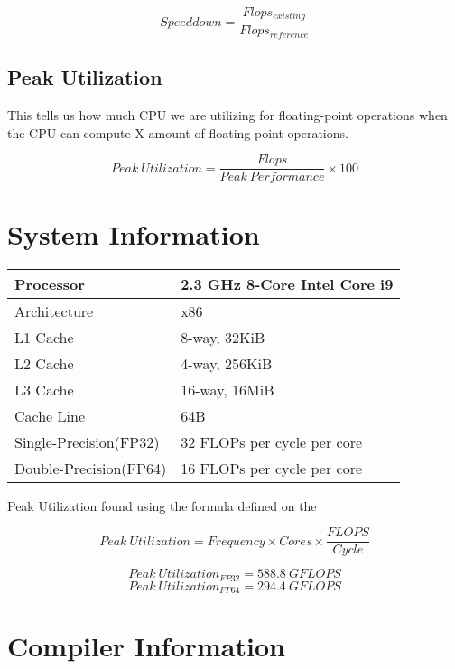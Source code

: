 \begin{equation}
    Speeddown = \frac{Flops_{existing}}{Flops_{reference}}
    \label{equ:speeddown}
\end{equation}

\subsection{Peak Utilization}

This tells us how much CPU we are utilizing for floating-point operations when 
the CPU can compute X amount of floating-point operations.

\begin{equation}
    Peak\ Utilization = \frac{Flops}{Peak\ Performance} \times 100
    \label{equ:peak_util}
\end{equation}

\section{System Information}

\begin{tabular}{|l | l|}
    \hline
    Processor & 2.3 GHz 8-Core Intel Core i9 \\
    \hline
    Architecture & x86 \\
    \hline
    L1 Cache & 8-way, 32KiB \\
    \hline
    L2 Cache & 4-way, 256KiB \\
    \hline
    L3 Cache & 16-way, 16MiB \\
    \hline
    Cache Line & 64B \\
    \hline
    Single-Precision(FP32) & 32 FLOPs per cycle per core \\
    \hline
    Double-Precision(FP64) & 16 FLOPs per cycle per core\\
    \hline
\end{tabular}

Peak Utilization found using the formula defined on the \citep{wiki:FLOPS}

\begin{equation}
    Peak\ Utilization = Frequency \times Cores \times \frac{FLOPS}{Cycle}
\end{equation}

\[Peak\ Utilization_{FP32} = 588.8\ GFLOPS\]
\[Peak\ Utilization_{FP64} = 294.4\ GFLOPS\]

\section{Compiler Information}

